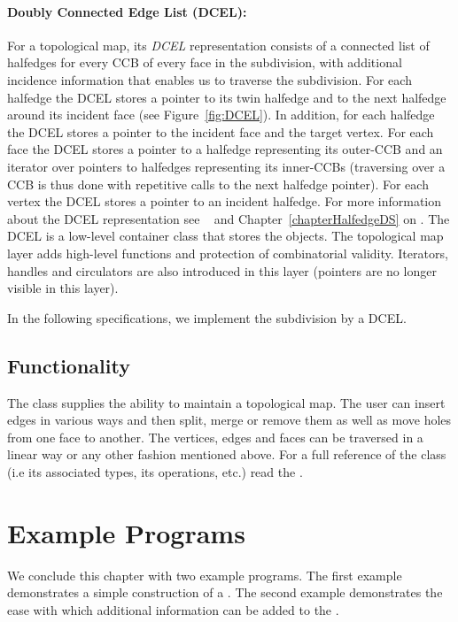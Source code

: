 \paragraph{Doubly Connected Edge List (DCEL):}
For a topological map, its {\em DCEL} representation consists of a
connected list of halfedges for every CCB of every face in the
subdivision, with additional incidence information that enables us to
traverse the subdivision. %
For each halfedge the DCEL
stores a pointer to its twin halfedge and to the next
halfedge around its incident face (see Figure~\ref{fig:DCEL}). In
addition, for each halfedge the DCEL stores a pointer to the incident
face and the target vertex.
For each face the DCEL stores a pointer to a halfedge representing
its outer-CCB and an iterator over pointers to halfedges representing
its inner-CCBs (traversing over a CCB is thus done with repetitive
calls to the next halfedge pointer).
For each vertex the DCEL stores a pointer to an incident halfedge. 
For more information about the DCEL
representation see ~\cite{bkos-cgaa-97} and Chapter~\ref{chapterHalfedgeDS}
on .
The DCEL is a low-level container class that stores the objects.
The topological map layer adds high-level functions and protection of
combinatorial validity. Iterators, handles and circulators are also
introduced in this layer (pointers are no longer visible in this layer).

In the following
specifications, we implement the subdivision by a DCEL. 

\subsection*{Functionality}

The class  supplies the ability to maintain
a topological map. The user can insert edges in various ways and then split,
merge or remove them as well as move holes from one face to another.
The vertices, edges and faces can be traversed in a 
linear way or any other fashion mentioned above.
For a full reference of the class (i.e its associated types,
its operations, etc.) read the .


\section{Example Programs}
\label{TPM_sec:example}
We conclude this chapter with two example programs. The first example
demonstrates a simple construction of a . The 
second example demonstrates the ease with which additional information can
be added to the .

